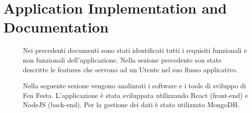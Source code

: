 \documentclass{article}
\begin{document}
\section{Application Implementation and Documentation}
\begin{description}
    \item[] Nei precedenti documenti sono stati identificati tutti i requisiti funzionali e non funzionali
        dell'applicazione. Nella sezione precedente son state descritte le features che servono ad un Utente nel
        suo flusso applicativo.
    \item[] Nella seguente sezione vengono analizzati i software e i tools di sviluppo di Fen Festa. L'applicazione è
        stata sviluppata utilizzando React (front-end) e NodeJS (back-end). Per la gestione dei dati è stato
        utilizzato MongoDB.
\end{description}
\end{document}
